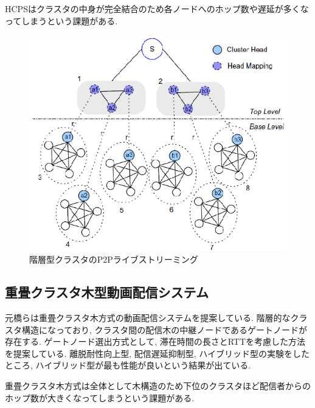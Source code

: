 \documentclass[letter]{ieicej}
\begin{document}
HCPSはクラスタの中身が完全結合のため各ノードへのホップ数や遅延が多くなってしまうという課題がある.

\begin{figure}[h]
  \begin{center}
    \includegraphics{fig1.eps}
  \end{center}
  \caption{階層型クラスタのP2Pライブストリーミング}
  \label{fig:fig01}
\end{figure}

\subsection{重畳クラスタ木型動画配信システム}
元橋らは重畳クラスタ木方式の動画配信システム\cite{chojo}を提案している. 階層的なクラスタ構造になっており, クラスタ間の配信木の中継ノードであるゲートノードが存在する. ゲートノード選出方式として, 滞在時間の長さとRTTを考慮した方法を提案している. 離脱耐性向上型, 配信遅延抑制型, ハイブリッド型の実験をしたところ, ハイブリッド型が最も性能が良いという結果が出ている.

重畳クラスタ木方式は全体として木構造のため下位のクラスタほど配信者からのホップ数が大きくなってしまうという課題がある.
\end{document}
